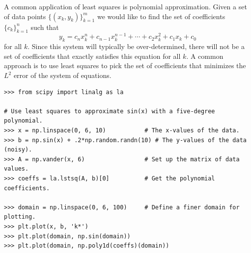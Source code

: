 A common application of least squares is polynomial approximation.
Given a set of data points $\{(x_k, y_k)\}_{k=1}^m$ we would like to find the set of coefficients $\{c_k\}_{k=1}^n$ such that
\[
y_k = c_n x_k^n + c_{n-1} x_k^{n-1} + \cdots + c_2 x_k^2 + c_1 x_k + c_0
\]
for all $k$.
Since this system will typically be over-determined, there will not be a set of coefficients that exactly satisfies this equation for all $k$.
A common approach is to use least squares to pick the set of coefficients that minimizes the $L^2$ error of the system of equations.

\begin{lstlisting}
>>> from scipy import linalg as la

# Use least squares to approximate sin(x) with a five-degree polynomial.
>>> x = np.linspace(0, 6, 10)           # The x-values of the data.
>>> b = np.sin(x) + .2*np.random.randn(10) # The y-values of the data (noisy).
>>> A = np.vander(x, 6)                 # Set up the matrix of data values.
>>> coeffs = la.lstsq(A, b)[0]          # Get the polynomial coefficients.

>>> domain = np.linspace(0, 6, 100)     # Define a finer domain for plotting.
>>> plt.plot(x, b, 'k*')
>>> plt.plot(domain, np.sin(domain))
>>> plt.plot(domain, np.poly1d(coeffs)(domain))
\end{lstlisting}

